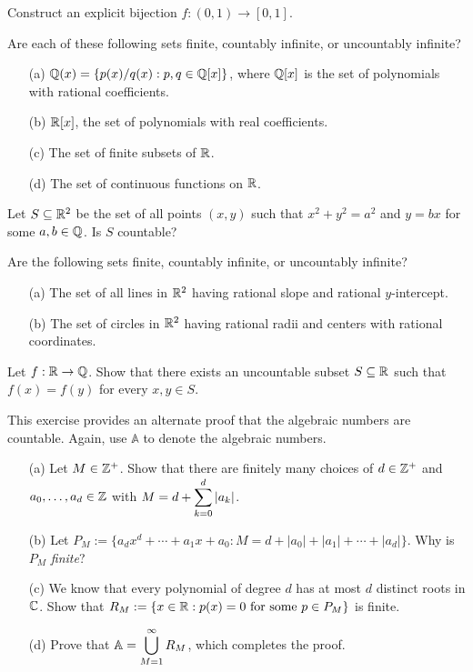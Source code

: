 \documentclass{article}
\begin{document}
\begin{exercise}
Construct an explicit bijection $f: (0,1) \to [0, 1]$.
\end{exercise}
\begin{exercise}
Are each of these following sets finite, countably infinite, or uncountably infinite?
\begin{itemize}
    \item[(a)] $\mathbb Q(x) = \{p(x)/q(x): p, q\in \mathbb Q[x]\}$, where $\mathbb Q[x]$ is the set of polynomials with rational coefficients.
    \item[(b)] $\mathbb R[x]$, the set of polynomials with real coefficients.
    \item[(c)] The set of finite subsets of $\mathbb R$.
    \item[(d)] The set of continuous functions on $\mathbb R$.
\end{itemize}
\end{exercise}

\begin{exercise}
Let $S\subseteq\mathbb R^2$ be the set of all points $(x,y)$ such that $x^2+y^2 = a^2$ and $y=bx$ for some $a,b\in\mathbb Q$. Is $S$ countable?
\end{exercise}
\begin{exercise}
Are the following sets finite, countably infinite, or uncountably infinite?
\begin{itemize}
    \item[(a)] The set of all lines in $\mathbb R^2$ having rational slope and rational $y$-intercept.
    \item[(b)] The set of circles in $\mathbb R^2$ having rational radii and centers with rational coordinates.
\end{itemize}
\end{exercise}
\begin{exercise}
Let $f: \mathbb R\to\mathbb Q$. Show that there exists an uncountable subset $S\subseteq\mathbb R$ such that $f(x) = f(y)$ for every $x,y\in S$.
\end{exercise}
\newpage

\begin{exercise}
This exercise provides an alternate proof that the algebraic numbers are countable. Again, use $\mathbb A$ to denote the algebraic numbers.
\begin{itemize}
    \item[(a)] Let $M\in\mathbb Z^+$. Show that there are finitely many choices of $d\in\mathbb Z^+$ and $a_0,\ldots, a_d\in \mathbb Z$ with $M = d + \displaystyle\sum_{k=0}^d |a_k|$.
    \item[(b)] Let $P_M := \{a_dx^d + \cdots + a_1x + a_0: M = d + |a_0| + |a_1| + \cdots + |a_d|\}$. Why is $P_M$ \textit{finite}?
    \item[(c)] We know that every polynomial of degree $d$ has at most $d$ distinct roots in $\mathbb C$. Show that $R_M := \{x\in\mathbb R: p(x) = 0 \textrm{ for some }p\in P_M\}$ is finite.
    \item[(d)] Prove that $\mathbb A = \displaystyle\bigcup_{M=1}^\infty R_M$, which completes the proof.
\end{itemize}
\end{exercise}
\end{document}
